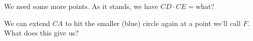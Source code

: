 

We need some more points. As it stands, we have $CD \cdot CE = \text{what?}$


We can extend $CA$ to hit the smaller (blue) circle again at a point we'll call $F.$ What does this give us?


















